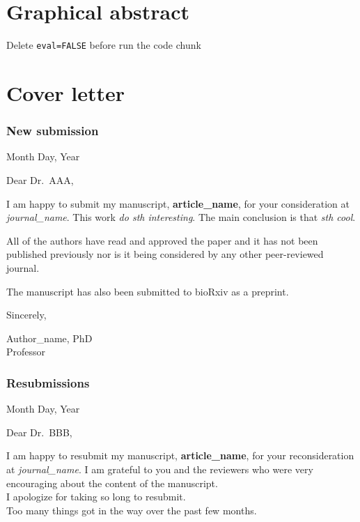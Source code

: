 \documentclass[review]{elsarticle} %
\begin{document}
\section*{Graphical abstract}\label{graphic}

Delete \texttt{eval=FALSE} before run the code chunk

\newpage

\section*{Cover letter}\label{cover-letter}

\subsubsection*{New submission}\label{new-submission}

Month Day, Year

Dear Dr.~AAA,

I am happy to submit my manuscript, \textbf{article\_name}, for your
consideration at \emph{journal\_name}. This work \emph{do sth
interesting}. The main conclusion is that \emph{sth cool}.

All of the authors have read and approved the paper and it has not been
published previously nor is it being considered by any other
peer-reviewed journal.

The manuscript has also been submitted to bioRxiv as a preprint.

Sincerely,

Author\_name, PhD\\
Professor

\subsubsection*{Resubmissions}\label{resubmissions}

Month Day, Year

Dear Dr.~BBB,

I am happy to resubmit my manuscript, \textbf{article\_name}, for your
reconsideration at \emph{journal\_name}. I am grateful to you and the
reviewers who were very encouraging about the content of the
manuscript.\\
I apologize for taking so long to resubmit.\\
Too many things got in the way over the past few months.
\end{document}
